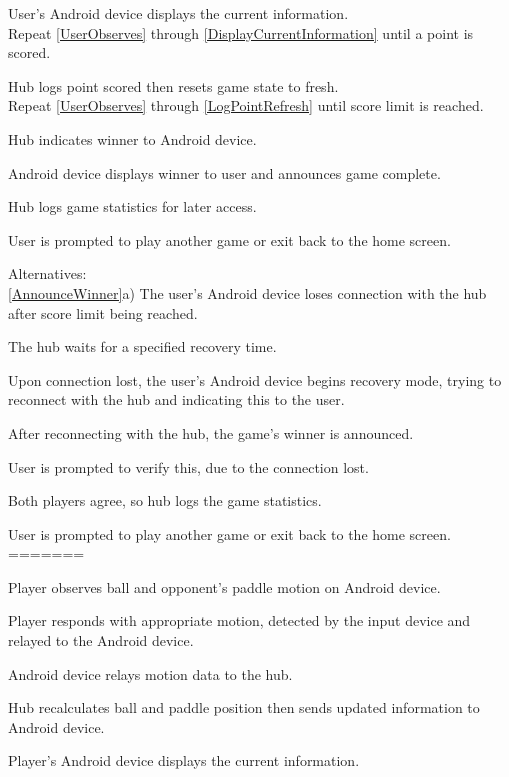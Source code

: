 \documentclass[12pt]{article}
\newenvironment{itemize*}%
  {\begin{itemize}%
  	\setlength{\parsep}{0pt}
    \setlength{\itemsep}{0pt}%
    \setlength{\parskip}{0pt}}%
  {\end{itemize}}
\newenvironment{enumerate*}%
  {\begin{enumerate}%
  	\setlength{\parsep}{0pt}
    \setlength{\itemsep}{0pt}%
    \setlength{\parskip}{0pt}}%
  {\end{enumerate}}
\begin{document}
\begin{itemize*}
\begin{enumerate*}
\item \label{DisplayCurrentInformation}User's Android device displays the current information.\\
Repeat \ref{UserObserves} through \ref{DisplayCurrentInformation} until a point is scored.
\item \label{LogPointRefresh}Hub logs point scored then resets game state to fresh.\\
Repeat \ref{UserObserves} through \ref{LogPointRefresh} until score limit is reached.
\item \label{AnnounceWinner}Hub indicates winner to Android device.
\item Android device displays winner to user and announces game complete.
\item Hub logs game statistics for later access.
\item User is prompted to play another game or exit back to the home screen.
\end{enumerate*}
Alternatives:\\
\ref{AnnounceWinner}a) The user's Android device loses connection with the hub after score limit being reached.
\begin{enumerate*}
\item The hub waits for a specified recovery time.
\item Upon connection lost, the user's Android device begins recovery mode, trying to reconnect with the hub and indicating this to the user.
\item After reconnecting with the hub, the game's winner is announced.  
\item User is prompted to verify this, due to the connection lost. 
\item Both players agree, so hub logs the game statistics.
\item User is prompted to play another game or exit back to the home screen.
=======
\item \label{playerObserves}Player observes ball and opponent's paddle motion on Android device.
\item Player responds with appropriate motion, detected by the input device and relayed to the Android device.
\item Android device relays motion data to the hub.
\item \label{HubUpdateGame}Hub recalculates ball and paddle position then sends updated information to Android device.
\item \label{DisplayCurrentInformation}Player's Android device displays the current information.\\

\end{enumerate*}
\end{itemize*}
\end{document}
